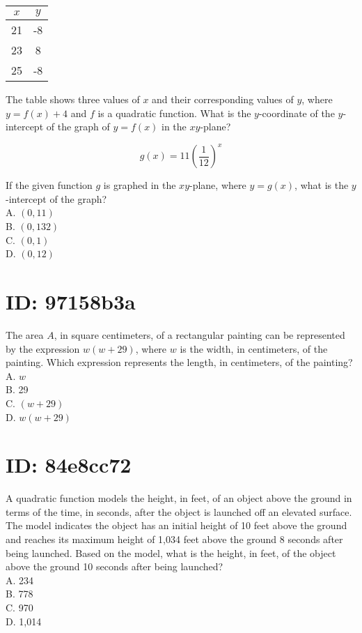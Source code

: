 \begin{center}
\begin{tabular}{|c|c|}
\hline
$x$ & $y$ \\
\hline
21 & -8 \\
\hline
23 & 8 \\
\hline
25 & -8 \\
\hline
\end{tabular}
\end{center}

The table shows three values of $x$ and their corresponding values of $y$, where $y=f(x)+4$ and $f$ is a quadratic function. What is the $y$-coordinate of the $y$-intercept of the graph of $y=f(x)$ in the $x y$-plane?

$$
g(x)=11\left(\frac{1}{12}\right)^{x}
$$

If the given function $g$ is graphed in the $x y$-plane, where $y=g(x)$, what is the $y$-intercept of the graph?\\
A. $(0,11)$\\
B. $(0,132)$\\
C. $(0,1)$\\
D. $(0,12)$

\section*{ID: 97158b3a}
The area $A$, in square centimeters, of a rectangular painting can be represented by the expression $w(w+29)$, where $w$ is the width, in centimeters, of the painting. Which expression represents the length, in centimeters, of the painting?\\
A. $w$\\
B. 29\\
C. $(w+29)$\\
D. $w(w+29)$

\section*{ID: 84e8cc72}
A quadratic function models the height, in feet, of an object above the ground in terms of the time, in seconds, after the object is launched off an elevated surface. The model indicates the object has an initial height of 10 feet above the ground and reaches its maximum height of 1,034 feet above the ground 8 seconds after being launched. Based on the model, what is the height, in feet, of the object above the ground 10 seconds after being launched?\\
A. 234\\
B. 778\\
C. 970\\
D. 1,014

